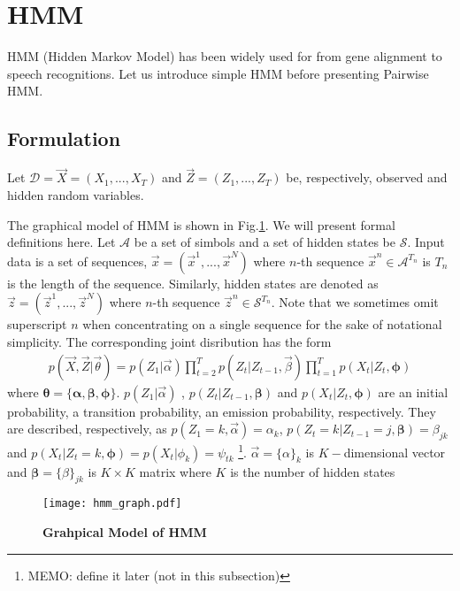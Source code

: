 %
%
\section{HMM}
HMM (Hidden Markov Model) has been widely used for from gene alignment to speech recognitions. Let us introduce simple HMM before presenting Pairwise HMM.

\subsection{Formulation}
Let $\mathcal{D}=\vec{X} = (X_1, ..., X_T)$ and $\vec{Z} = (Z_1, ..., Z_T)$ be, respectively, observed and hidden random variables. 

The graphical model of HMM is shown in Fig.\ref{fig:hmm_graph}. We will present formal definitions here.
Let $\mathcal{A}$ be a set of simbols and a set of hidden states be $\mathcal{S}$.
Input data is a set of sequences, $\vec{x} = (\vec{x}^1, ..., \vec{x}^{N})$ where $n$-th sequence $\vec{x}^n \in \mathcal{A}^{T_n}$ is $T_n$ is the length of the sequence.
Similarly, hidden states are denoted as $\vec{z} = (\vec{z}^1, ..., \vec{z}^{N})$ where $n$-th sequence $\vec{z}^n \in \mathcal{S}^{T_n}$. Note that we sometimes omit superscript $n$ when concentrating on a single sequence for the sake of notational simplicity.
The corresponding joint disribution has the form
\begin{eqnarray}
  p(\vec{X}, \vec{Z} | \vec{\theta}) = p(Z_1 | \vec{\alpha}) \prod_{t=2}^T p(Z_t|Z_{t-1}, \vec{\beta}) \prod_{t=1}^T p(X_t | Z_t, \mathbf{\phi})
\end{eqnarray}
where $\mathbf{\theta} = \{\mathbf{\alpha}, \mathbf{\beta}, \mathbf{\phi} \}$. $p(Z_1| \vec{\alpha})$ , $p(Z_t|Z_{t-1}, \mathbf{\beta})$ and $p(X_t|Z_t, \mathbf{\phi})$ are an initial probability, a transition probability, an emission probability, respectively.
They are described, respectively, as $p(Z_1 = k, \vec{\alpha}) = \alpha_k$, $p(Z_t = k|Z_{t-1}=j, \mathbf{\beta}) = \beta_{jk}$ and $p(X_t|Z_t = k, \mathbf{\phi}) = p(X_t|\phi_k) = \psi_{tk}$ \footnote{MEMO: define it later (not in this subsection)}. 
$\vec{\alpha} = \{\alpha\}_k$ is $K-$dimensional vector and $\mathbf{\beta} = \{\beta\}_{jk}$ is $K \times K$ matrix where $K$ is the number of hidden states

\begin{figure}
  \centering
  \texttt{[image: hmm\_graph.pdf]}
  \caption{{\bf Grahpical Model of HMM}}
  \label{fig:hmm_graph}
\end{figure}

